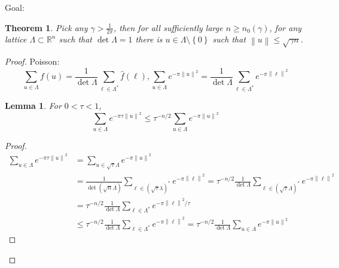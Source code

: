 \documentclass{report}
\newcommand{\R}{\mathbb{R}}
\newcommand{\norm}[1]{\left\| #1 \right\|}
\newcommand{\set}[1]{\left\{ #1 \right\}}
\newtheorem{theorem}{Theorem}[section]
\newtheorem{lemma}{Lemma}[section]
\theoremstyle{definition}
\theoremstyle{remark}
\numberwithin{equation}{section}
\begin{document}
Goal: 
\begin{theorem}
    Pick any $\gamma > \frac{1}{2\pi}$, then for all sufficiently large $n \geq n_0(\gamma)$, for any lattice $\Lambda \subset \R^n$ such that $\det \Lambda = 1$ there is $u \in \Lambda \setminus \set{0}$ such that $\norm{u} \leq \sqrt{\gamma n}$.
\end{theorem}
\begin{proof}
    Poisson:
    \[\sum_{u \in \Lambda} f(u) =\frac{1}{\det \Lambda} \sum_{\ell \in \Lambda^*} \widehat{f}(\ell), \sum_{u \in \Lambda} e^{-\pi\norm{u}^2} = \frac{1}{\det\Lambda}\sum_{\ell \in \Lambda^*} e^{-\pi\norm{\ell}^2}\]

    \begin{lemma}
        For $0 < \tau < 1$, \[\sum_{u \in \Lambda} e^{-\pi \tau \norm{u}^2} \leq \tau^{-n/2}\sum_{u \in \Lambda} e^{-\pi\norm{u}^2}\]
    \end{lemma}
    \begin{proof}
        \begin{align*}
            \sum_{u \in \Lambda}e^{-\pi\tau\norm{u}^2} & = \sum_{u \in \sqrt{\tau}\Lambda} e^{-\pi\norm{u}^2} \\
            & = \frac{1}{\det (\sqrt{n}\Lambda)}\sum_{\ell \in (\sqrt{\tau}\lambda)^*} e^{-\pi \norm{\ell}^2} = \tau^{-n/2}\frac{1}{\det\Lambda}\sum_{\ell \in (\sqrt{\tau}\Lambda)^*} e^{-\pi \norm{\ell}^2} \\
            & = \tau^{-n/2}\frac{1}{\det\Lambda}\sum_{\ell \in \Lambda^*} e^{-\pi \norm{\ell}^2/\tau} \\
            & \leq \tau^{-n/2}\frac{1}{\det\Lambda}\sum_{\ell \in \Lambda^*} e^{-\pi \norm{\ell}^2} = \tau^{-n/2}\frac{1}{\det\Lambda}\sum_{u \in \Lambda} e^{-\pi \norm{u}^2}
        \end{align*}
    \end{proof}


\end{proof}
\end{document}
